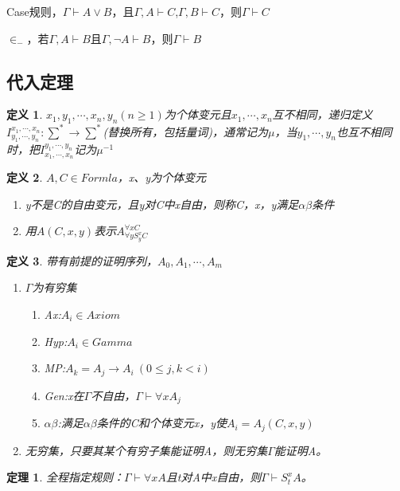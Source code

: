 \documentclass[a4paper]{ctexart}
\newtheorem{thm}{\hspace{2em}定理}[subsection]
\newtheorem{defi}{\hspace{2em}定义}[subsection]
\begin{document}
Case规则，$\Gamma\vdash A\vee B$，且$\Gamma,A\vdash C$,$\Gamma,B\vdash C$，则$\Gamma\vdash C$

$\in_-$，若$\Gamma,A\vdash B$且$\Gamma,\neg A\vdash B$，则$\Gamma\vdash B$

\subsection{代入定理}
\begin{defi}
  $x_1,y_1,\cdots,x_n,y_n(n\geq 1)$为个体变元且$x_1,\cdots,x_n$互不相同，递归定义$I^{x_1,\cdots,x_n}_{y_1,\cdots,y_n}:\sum^*\rightarrow \sum^*$(替换所有，包括量词)，通常记为$\mu$，当$y_1,\cdots,y_n$也互不相同时，把$I_{x_1,\cdots,x_n}^{y_1,\cdots,y_n}$记为$\mu^{-1}$
\end{defi}

\begin{defi}
  $A,C\in Formla$，x、y为个体变元
  \begin{enumerate}[itemindent=2em]
    \item y不是C的自由变元，且y对C中x自由，则称C，x，y满足$\alpha\beta$条件
    \item 用$A(C,x,y)$表示$A^{\forall{x}C}_{\forall{y}S_y^xC}$
  \end{enumerate}
\end{defi}

\begin{defi}
  带有前提的证明序列，$A_0,A_1,\cdots,A_m$
  \begin{enumerate}[itemindent=2em]
    \item $\Gamma$为有穷集
    \begin{enumerate}
      \item Ax:$A_i\in Axiom$
      \item Hyp:$A_i\in Gamma$
      \item MP:$A_k=A_j\rightarrow A_i\ (0\leq j,k<i)$
      \item Gen:x在$\Gamma$不自由，$\Gamma\vdash \forall{x}A_j$
      \item $\alpha\beta$:满足$\alpha\beta$条件的C和个体变元x，y使$A_i=A_j(C,x,y)$
    \end{enumerate}
    \item 无穷集，只要其某个有穷子集能证明A，则无穷集$\Gamma$能证明A。
  \end{enumerate}
\end{defi}

\begin{thm}
  全程指定规则：$\Gamma\vdash\forall{x}A$且t对A中x自由，则$\Gamma\vdash S_t^xA$。
\end{thm}
\end{document}
